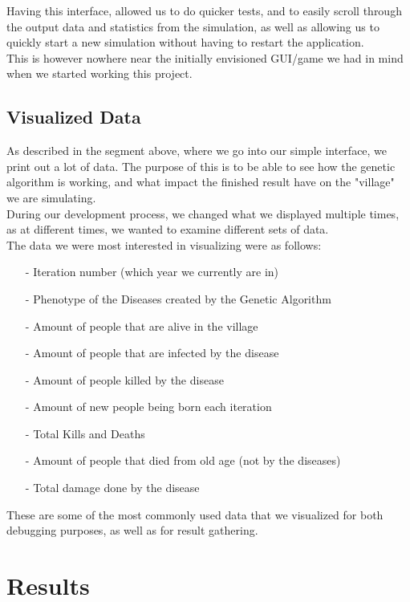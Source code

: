 \documentclass[conference,compsoc]{IEEEtran}
\begin{document}
Having this interface, allowed us to do quicker tests, and to easily scroll through the output data and statistics from the simulation, as well as allowing us to quickly start a new simulation without having to restart the application.\\
This is however nowhere near the initially envisioned GUI/game we had in mind when we started working this project.\\

\subsection{Visualized Data}
As described in the segment above, where we go into our simple interface, we print out a lot of data. The purpose of this is to be able to see how the genetic algorithm is working, and what impact the finished result have on the "village" we are simulating.\\
During our development process, we changed what we displayed multiple times, as at different times, we wanted to examine different sets of data.\\
The data we were most interested in visualizing were as follows:\\
\begin{itemize}
\item[-] Iteration number (which year we currently are in)
\item[-] Phenotype of the Diseases created by the Genetic Algorithm
\item[-] Amount of people that are alive in the village
\item[-] Amount of people that are infected by the disease
\item[-] Amount of people killed by the disease
\item[-] Amount of new people being born each iteration
\item[-] Total Kills and Deaths
\item[-] Amount of people that died from old age (not by the diseases)
\item[-] Total damage done by the disease
\end{itemize}
These are some of the most commonly used data that we visualized for both debugging purposes, as well as for result gathering.\\


\section{Results}
\end{document}
